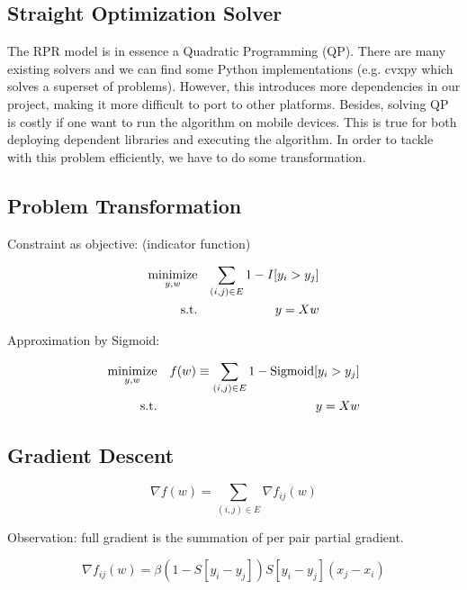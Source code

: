 \documentclass{sig-alternate}
\begin{document}
\subsection{Straight Optimization Solver}
\label{sec:Straight Optimization Solver}


The RPR model is in essence a Quadratic Programming (QP). 
There are many existing solvers and 
we can find some Python implementations 
(e.g. cvxpy which solves a superset of problems). 
However, this introduces more dependencies in our project, 
making it more difficult to port to other platforms. 
Besides, solving QP is costly 
if one want to run the algorithm on mobile devices. 
This is true for both deploying dependent libraries and executing the algorithm.
In order to tackle with this problem efficiently, 
we have to do some transformation. 

\subsection{Problem Transformation}
\label{sec:Problem Transformation}

Constraint as objective: (indicator function)

\begin{eqnarray}
	\operatorname*{minimize}_{y,w} && \sum_{(i,j) \in E} 1 - I[y_i > y_j] \\
	\text{s.t.} && y = Xw
\end{eqnarray}

Approximation by Sigmoid:

\begin{eqnarray}
	\operatorname*{minimize}_{y,w} && f(w) \equiv \sum_{(i,j) \in E} 1 - \text{Sigmoid}[y_i > y_j] \\
	\text{s.t.} && y = Xw
\end{eqnarray}


\subsection{Gradient Descent}
\label{sec:Gradient Descent}

\begin{equation}
	\nabla f(w) = \sum_{(i,j) \in E} \nabla f_{ij}(w) 
\end{equation}

Observation: full gradient is the summation of
per pair partial gradient. 

\begin{equation}
	\nabla f_{ij}(w) = \beta (1-S[y_i - y_j])S[y_i-y_j](x_j-x_i)
\end{equation}
\end{document}
